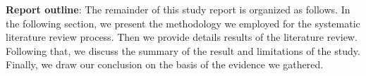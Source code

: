%     
    

\textbf{Report outline}:
The remainder of this study report is organized as follows. In the following section, we present the methodology we employed for the systematic literature review process. Then we provide details results of the literature review. Following that, we discuss the summary of the result and limitations of the study. Finally, we draw our conclusion on the basis of the evidence we gathered.   
